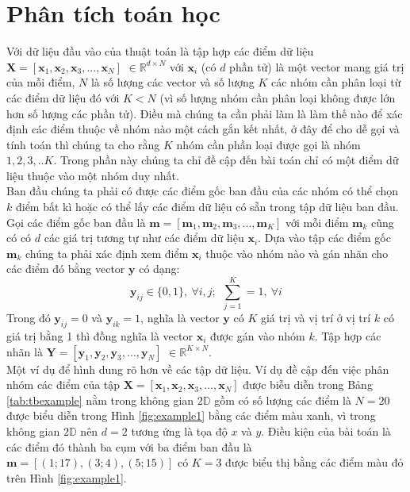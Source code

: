 \documentclass{article}
\begin{document}
	\section{Phân tích toán học} %
	\label{sec:phân_tích_toán_học}
	Với dữ liệu đầu vào của thuật toán là tập hợp các điểm dữ liệu $\mathbf{X} = [\mathbf{x}_1,\mathbf{x}_2,\mathbf{x}_3,...,\mathbf{x}_N]$ $\in \mathds{R}^{d\times N}$ với $\mathbf{x}_i$ (có $d$ phần tử) là một vector mang giá trị của mỗi điểm, $N$ là số lượng các vector và số lượng $K$ các nhóm cần phân loại từ các điểm dữ liệu đó với $K < N$ (vì số lượng nhóm cần phân loại không được lớn hơn số lượng các phần tử). Điều mà chúng ta cần phải làm là làm thế nào để xác định các điểm thuộc về nhóm nào một cách gắn kết nhất, ở đây để cho dễ gọi và tính toán thì chúng ta cho rằng $K$ nhóm cần phần loại được gọi là nhóm $1,2,3,..K$. Trong phần này chúng ta chỉ đề cập đến bài toán chỉ có một điểm dữ liệu thuộc vào một nhóm duy nhất.
	\\
	Ban đầu chúng ta phải có được các điểm gốc ban đầu của các nhóm có thể chọn $k$ điểm bất kì hoặc có thể lấy các điểm dữ liệu có sẵn trong tập dữ liệu ban đầu. Gọi các điểm gốc ban đầu là $\mathbf{m} = [\mathbf{m}_1,\mathbf{m}_2,\mathbf{m}_3,...,\mathbf{m}_K]$ với mỗi điểm $\mathbf{m}_k$ cũng có có $d$ các giá trị tương tự như các điểm dữ liệu $\mathbf{x}_i$. Dựa vào tập các điểm gốc $\mathbf{m}_k$ chúng ta phải xác định xem điểm $\mathbf{x}_i$ thuộc vào nhóm nào và gán nhãn cho các điểm đó bằng vector $\mathbf{y}$ có dạng:
	$$\mathbf{y}_{ij} \in \{0,1\},\ \forall i,j;\ \  \sum_{j = 1}^{K} = 1,\  \forall i$$
	Trong đó $\mathbf{y}_{ij} = 0$ và $\mathbf{y}_{ik} = 1$, nghĩa là vector $\mathbf{y}$ có $K$ giá trị và vị trí ở vị trí $k$ có giá trị bằng 1 thì đồng nghĩa là vector $\mathbf{x}_i$ được gán vào nhóm $k$. Tập hợp các nhãn là $\mathbf{Y} = [\mathbf{y}_1,\mathbf{y}_2,\mathbf{y}_3,...,\mathbf{y}_N]$ $\in \mathds{R}^{K\times N}$.
	\\ 
	Một ví dụ để hình dung rõ hơn về các tập dữ liệu. Ví dụ đề cập đến việc phân nhóm các điểm của tập $\mathbf{X} = [\mathbf{x}_1,\mathbf{x}_2,\mathbf{x}_3,...,\mathbf{x}_N]$ được biễu diễn trong Bảng \ref{tab:tbexample} nằm trong  không gian $2\mathds{D}$ gồm có số lượng các điểm là $N = 20$ được biểu diễn trong Hình \ref{fig:example1} bằng các điểm màu xanh, vì trong không gian $2\mathds{D}$ nên $d = 2$ tương ứng là tọa độ $x$ và $y$. Điều kiện của bài toán là các điểm đó thành ba cụm với ba điểm ban đầu là $\mathbf{m} = [(1;17),(3;4),(5;15)]$ có $K = 3$ được biểu thị bằng các điểm màu đỏ trên Hình \ref{fig:example1}.
	
\end{document}
